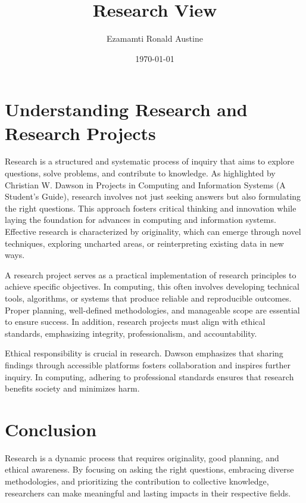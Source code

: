\documentclass{article}
\title{\textbf{Research View}}
\author{Ezamamti Ronald Austine}
\date{\today}
\begin{document}
\maketitle

\section*{Understanding Research and Research Projects}

Research is a structured and systematic process of inquiry that aims to explore questions, solve problems, and contribute to knowledge. As highlighted by Christian W. Dawson in Projects in Computing and Information Systems (A Student’s Guide), research involves not just seeking answers but also formulating the right questions. This approach fosters critical thinking and innovation while laying the foundation for advances in computing and information systems. Effective research is characterized by originality, which can emerge through novel techniques, exploring uncharted areas, or reinterpreting existing data in new ways.

A research project serves as a practical implementation of research principles to achieve specific objectives. In computing, this often involves developing technical tools, algorithms, or systems that produce reliable and reproducible outcomes. Proper planning, well-defined methodologies, and manageable scope are essential to ensure success. In addition, research projects must align with ethical standards, emphasizing integrity, professionalism, and accountability.

Ethical responsibility is crucial in research. Dawson emphasizes that sharing findings through accessible platforms fosters collaboration and inspires further inquiry. In computing, adhering to professional standards ensures that research benefits society and minimizes harm.

\section*{Conclusion}

Research is a dynamic process that requires originality, good planning, and ethical awareness. By focusing on asking the right questions, embracing diverse methodologies, and prioritizing the contribution to collective knowledge, researchers can make meaningful and lasting impacts in their respective fields.
\end{document}

